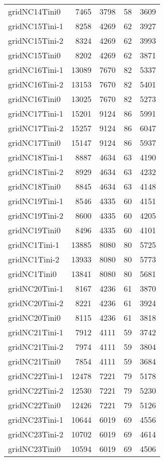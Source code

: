 \begin{longtable}{lrrrr}
gridNC14Tini0 & 7465 & 3798 & 58 & 3609 \\
gridNC15Tini-1 & 8258 & 4269 & 62 & 3927 \\
gridNC15Tini-2 & 8324 & 4269 & 62 & 3993 \\
gridNC15Tini0 & 8202 & 4269 & 62 & 3871 \\
gridNC16Tini-1 & 13089 & 7670 & 82 & 5337 \\
gridNC16Tini-2 & 13153 & 7670 & 82 & 5401 \\
gridNC16Tini0 & 13025 & 7670 & 82 & 5273 \\
gridNC17Tini-1 & 15201 & 9124 & 86 & 5991 \\
gridNC17Tini-2 & 15257 & 9124 & 86 & 6047 \\
gridNC17Tini0 & 15147 & 9124 & 86 & 5937 \\
gridNC18Tini-1 & 8887 & 4634 & 63 & 4190 \\
gridNC18Tini-2 & 8929 & 4634 & 63 & 4232 \\
gridNC18Tini0 & 8845 & 4634 & 63 & 4148 \\
gridNC19Tini-1 & 8546 & 4335 & 60 & 4151 \\
gridNC19Tini-2 & 8600 & 4335 & 60 & 4205 \\
gridNC19Tini0 & 8496 & 4335 & 60 & 4101 \\
gridNC1Tini-1 & 13885 & 8080 & 80 & 5725 \\
gridNC1Tini-2 & 13933 & 8080 & 80 & 5773 \\
gridNC1Tini0 & 13841 & 8080 & 80 & 5681 \\
gridNC20Tini-1 & 8167 & 4236 & 61 & 3870 \\
gridNC20Tini-2 & 8221 & 4236 & 61 & 3924 \\
gridNC20Tini0 & 8115 & 4236 & 61 & 3818 \\
gridNC21Tini-1 & 7912 & 4111 & 59 & 3742 \\
gridNC21Tini-2 & 7974 & 4111 & 59 & 3804 \\
gridNC21Tini0 & 7854 & 4111 & 59 & 3684 \\
gridNC22Tini-1 & 12478 & 7221 & 79 & 5178 \\
gridNC22Tini-2 & 12530 & 7221 & 79 & 5230 \\
gridNC22Tini0 & 12426 & 7221 & 79 & 5126 \\
gridNC23Tini-1 & 10644 & 6019 & 69 & 4556 \\
gridNC23Tini-2 & 10702 & 6019 & 69 & 4614 \\
gridNC23Tini0 & 10594 & 6019 & 69 & 4506 \\

\end{longtable}
